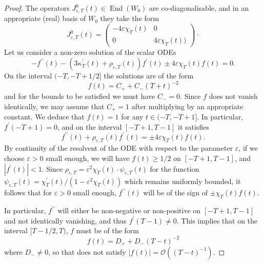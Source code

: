\documentclass{article}
\numberwithin{equation}{section}        %
\theoremstyle{bfnote}
\theoremstyle{definition}
\theoremstyle{bfremark}
\DeclareMathOperator{\End}{End}                 %
\begin{document}
\begin{proof}
    The operators $J^0_{\varepsilon,T}(t) \in \End(W_0)$ are co-diagonalisable, and in an appropriate (real) basis of $W_0$ they take the form
    \begin{equation*}
        J^0_{\varepsilon,T}(t) =
            \begin{pmatrix}
                -4\varepsilon \chi_T(t) & 0 \\
                0 & 4\varepsilon \chi_T(t))
            \end{pmatrix} \cdot
    \end{equation*}
    Let us consider a non-zero solution of the scalar ODEs
    \begin{equation*}
        -f^{\prime\prime}(t) - (3 \kappa_T^\prime(t) +\rho_{\varepsilon,T}(t))f^\prime(t)  \pm 4 \varepsilon \chi_T(t) f(t) = 0 .
    \end{equation*}
    On the interval $(-T,-T+1/2]$ the solutions are of the form
    \begin{equation*}
        f(t) = C_+ + C_- (T+t)^{-2}
    \end{equation*}
    and for the bounds to be satisfied we must have $C_- = 0$. Since $f$ does not vanish identically, we may assume that $C_+ = 1$ after multiplying by an appropriate constant. We deduce that $f(t) = 1$ for any $t \in (-T,-T+1]$. In particular, $f^\prime(-T+1) = 0$, and on the interval $[-T+1,T-1]$ it satisfies
    \begin{equation*}
        f^{\prime\prime}(t) + \rho_{\varepsilon,T}(t) f^\prime(t) = \pm 4 \varepsilon \chi_T(t) f(t) .
    \end{equation*}
    By continuity of the resolvent of the ODE with respect to the parameter $\varepsilon$, if we choose $\varepsilon > 0$ small enough, we will have $f(t) \geq 1/2$ on $[-T+1,T-1]$, and $|f^\prime(t)| < 1$. Since $\rho_{\varepsilon,T} = \varepsilon^2 \chi_T(t) \cdot \psi_{\varepsilon,T}(t)$ for the function $\psi_{\varepsilon,T}(t) = \chi^\prime_T(t)/ (1-\varepsilon^2\chi_T(t))$ which remains uniformly bounded, it follows that for $\varepsilon > 0$ small enough, $f^{\prime\prime}(t)$ will be of the sign of $\pm \chi_T(t) f(t)$. 
    
    In particular, $f^{\prime\prime}$ will either be non-negative or non-positive on $[-T+1,T-1]$ and not identically vanishing, and thus $f^\prime(T-1) \neq 0$. This implies that on the interval $[T-1/2,T)$, $f$ must be of the form
    \begin{equation*}
        f(t) = D_+ + D_- (T-t)^{-2}
    \end{equation*}
    where $D_- \neq 0$, so that does not satisfy $|f(t)| = \mathcal{O}((T-t)^{-1})$.
\end{proof}
\end{document}
